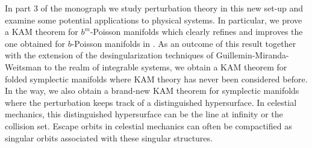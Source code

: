 In part 3 of the monograph we study perturbation theory in this new set-up and examine some potential applications to physical systems. In particular, we prove a KAM theorem for $b^m$-Poisson manifolds which clearly refines and improves the one obtained for $b$-Poisson manifolds in \cite{KMS16}. As an outcome of this result together with the extension of the desingularization techniques of Guillemin-Miranda-Weitsman to the realm of integrable systems, we obtain a KAM theorem for folded symplectic manifolds where KAM theory has never been considered before. In the way, we also obtain a brand-new KAM theorem for symplectic manifolds where the perturbation keeps track of a distinguished hypersurface. In celestial mechanics, this distinguished hypersurface can be the line at infinity or the collision set. Escape orbits in celestial mechanics can often be compactified as singular orbits associated with these singular structures.



